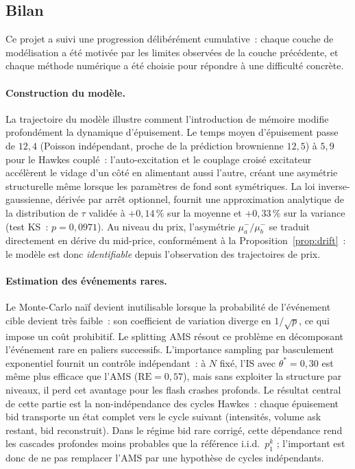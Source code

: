 \documentclass[11pt,a4paper]{article}
\theoremstyle{definition}
\begin{document}
\subsection*{Bilan}

Ce projet a suivi une progression délibérément cumulative~: chaque couche de
modélisation a été motivée par les limites observées de la couche précédente,
et chaque méthode numérique a été choisie pour répondre à une difficulté
concrète.

\paragraph{Construction du modèle.}
La trajectoire du modèle illustre comment l'introduction de mémoire modifie
profondément la dynamique d'épuisement. Le temps moyen d'épuisement passe de
$12{,}4$ (Poisson indépendant, proche de la prédiction brownienne $12{,}5$) à
$5{,}9$ pour le Hawkes couplé~: l'auto-excitation et le couplage croisé excitateur
accélèrent le vidage d'un côté en alimentant aussi l'autre, créant une asymétrie
structurelle même lorsque les paramètres de fond sont symétriques. La loi
inverse-gaussienne, dérivée par arrêt optionnel, fournit une approximation
analytique de la distribution de $\tau$ validée à $+0{,}14\,\%$ sur la moyenne
et $+0{,}33\,\%$ sur la variance (test KS~: $p=0{,}0971$). Au niveau du prix, l'asymétrie $\mu_a^-/\mu_b^-$
se traduit directement en dérive du mid-price, conformément à la
Proposition~\ref{prop:drift}~: le modèle est donc \emph{identifiable} depuis
l'observation des trajectoires de prix.

\paragraph{Estimation des événements rares.}
Le Monte-Carlo naïf devient inutilisable lorsque la probabilité de l'événement
cible devient très faible~: son coefficient de variation diverge en
$1/\sqrt{p}$, ce qui impose un coût prohibitif. Le splitting AMS résout ce
problème en décomposant l'événement rare en paliers successifs. L'importance
sampling par basculement exponentiel fournit un contrôle indépendant~: à $N$
fixé, l'IS avec $\theta^*=0{,}30$ est même plus efficace que l'AMS
($\mathrm{RE}=0{,}57$), mais sans exploiter la structure par niveaux, il perd
cet avantage pour les flash crashes profonds.
Le résultat central de cette partie est la non-indépendance des cycles Hawkes~:
chaque épuisement bid transporte un état complet vers le cycle suivant
(intensités, volume ask restant, bid reconstruit). Dans le régime bid rare
corrigé, cette dépendance rend les cascades profondes moins probables que la
référence i.i.d.\ $p_1^k$ ; l'important est donc de ne pas remplacer l'AMS par
une hypothèse de cycles indépendants.
\end{document}
